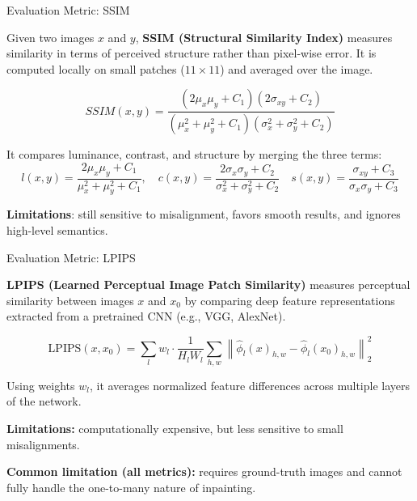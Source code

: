 \documentclass[aspectratio=43]{beamer}
\begin{document}
	
	\begin{frame}{Evaluation Metric: SSIM}
		
		Given two images $x$ and $y$, \textbf{SSIM (Structural Similarity Index)} measures similarity in terms of perceived structure rather than pixel-wise error. It is computed locally on small patches ($11\times 11$) and averaged over the image.
		
		\begin{equation*}
			SSIM(x,y) = \frac{(2\mu_x \mu_y + C_1)(2\sigma_{xy} + C_2)}{(\mu_x^2 + \mu_y^2 + C_1)(\sigma_x^2 + \sigma_y^2 + C_2)}
		\end{equation*}
		
		It compares luminance, contrast, and structure by merging the three terms:
		{\small
			$$
			l(x,y) = \frac{2\mu_x \mu_y + C_1}{\mu_x^2 + \mu_y^2 + C_1},
			\quad
			c(x,y) = \frac{2\sigma_x \sigma_y + C_2}{\sigma_x^2 + \sigma_y^2 + C_2}
			\quad
			s(x,y) = \frac{\sigma_{xy} + C_3}{\sigma_x \sigma_y + C_3}
			$$
		}
		
		\textbf{Limitations}: still sensitive to misalignment, favors smooth results, and ignores high-level semantics.
		
	\end{frame}
	
	
	
	
	\begin{frame}{Evaluation Metric: LPIPS}
		
		\textbf{LPIPS (Learned Perceptual Image Patch Similarity)} measures perceptual similarity between images $x$ and $x_0$ by comparing deep feature representations extracted from a pretrained CNN (e.g., VGG, AlexNet).
		
		\begin{equation*}
			\text{LPIPS}(x, x_0) =
			\sum_l w_l \cdot \frac{1}{H_l W_l}
			\sum_{h,w}
			\left\| \hat{\phi}_l(x)_{h,w} - \hat{\phi}_l(x_0)_{h,w} \right\|_2^2
		\end{equation*}
		
		Using weights $w_l$, it averages normalized feature differences across multiple layers of the network. 
		
		\vspace{0.2cm}
		\textbf{Limitations:} computationally expensive, but less sensitive to small misalignments.
		
		\vspace{0.2cm}
		\textbf{Common limitation (all metrics):} requires ground-truth images and cannot fully handle the one-to-many nature of inpainting.
		
	\end{frame}
	
\end{document}
